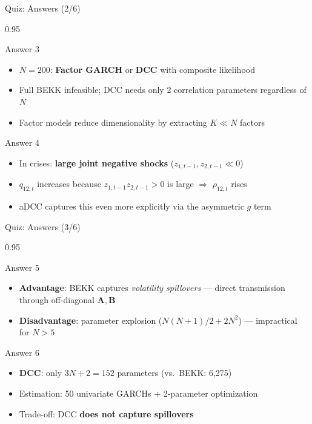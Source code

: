 \documentclass[9pt, aspectratio=169, t]{beamer}
\begin{document}
\begin{frame}{Quiz: Answers (2/6)}
    \begin{cminipage}{0.95\textwidth}
    {\scriptsize
    \begin{exampleblock}{Answer 3}
        \begin{itemize}\setlength{\itemsep}{0pt}
            \item $N = 200$: \textbf{Factor GARCH} or \textbf{DCC} with composite likelihood
            \item Full BEKK infeasible; DCC needs only 2 correlation parameters regardless of $N$
            \item Factor models reduce dimensionality by extracting $K \ll N$ factors
        \end{itemize}
    \end{exampleblock}
    \begin{exampleblock}{Answer 4}
        \begin{itemize}\setlength{\itemsep}{0pt}
            \item In crises: \textbf{large joint negative shocks} ($z_{1,t-1}, z_{2,t-1} \ll 0$)
            \item $q_{12,t}$ increases because $z_{1,t-1}z_{2,t-1} > 0$ is large $\Rightarrow$ $\rho_{12,t}$ rises
            \item aDCC captures this even more explicitly via the asymmetric $g$ term
        \end{itemize}
    \end{exampleblock}
    }
    \end{cminipage}
\end{frame}

\begin{frame}{Quiz: Answers (3/6)}
    \begin{cminipage}{0.95\textwidth}
    {\scriptsize
    \begin{exampleblock}{Answer 5}
        \begin{itemize}\setlength{\itemsep}{0pt}
            \item \textbf{Advantage}: BEKK captures \textit{volatility spillovers} --- direct transmission through off-diagonal $\mathbf{A}, \mathbf{B}$
            \item \textbf{Disadvantage}: parameter explosion ($N(N+1)/2 + 2N^2$) --- impractical for $N > 5$
        \end{itemize}
    \end{exampleblock}
    \begin{exampleblock}{Answer 6}
        \begin{itemize}\setlength{\itemsep}{0pt}
            \item \textbf{DCC}: only $3N + 2 = 152$ parameters (vs.\ BEKK: 6,275)
            \item Estimation: 50 univariate GARCHs + 2-parameter optimization
            \item Trade-off: DCC \textbf{does not capture spillovers}
        \end{itemize}
    \end{exampleblock}
    }
    \end{cminipage}
\end{frame}
\end{document}
